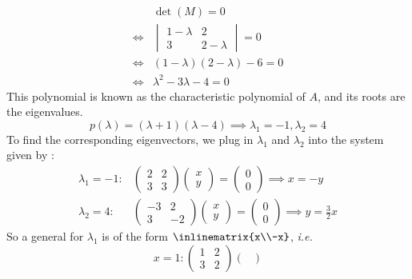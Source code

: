 \begin{exm}
\begin{align*}
		 & \det(M)=0                    \\
		\Leftrightarrow
		 & \begin{vmatrix}
			1-\lambda & 2         \\
			3         & 2-\lambda
		\end{vmatrix}=0 \\
		\Leftrightarrow
		 & (1-\lambda)(2-\lambda)-6=0   \\
		\Leftrightarrow
		 & \lambda^2-3\lambda-4=0
	\end{align*}
	This polynomial is known as the characteristic polynomial of $A$, and its roots
	are the eigenvalues.
	\begin{equation*}
		p(\lambda)=(\lambda+1)(\lambda-4) \implies \lambda_1=-1,\lambda_2=4
	\end{equation*}
	To find the corresponding eigenvectors, we plug in $\lambda_1$ and $\lambda_2$
	into the system given by :
	\begin{align*}
		\boxed{\lambda_1=-1}: & \begin{pmatrix}
			2 & 2 \\
			3 & 3
		\end{pmatrix}\begin{pmatrix}
			x \\ y
		\end{pmatrix}=\begin{pmatrix}
			0 \\ 0
		\end{pmatrix}\implies x=-y            \\
		\boxed{\lambda_2=4}:  & \begin{pmatrix}
			-3 & 2  \\
			3  & -2
		\end{pmatrix}\begin{pmatrix}
			x \\ y
		\end{pmatrix}=\begin{pmatrix}
			0 \\ 0
		\end{pmatrix}\implies y=\tfrac{3}{2}x
	\end{align*}
	So a general for $\lambda_1$ is of the form
	$\inlinematrix{x\\-x}$, \textit{i.e.}
	\begin{equation*}
		x=1:\begin{pmatrix}
			1 & 2 \\
			3 & 2
		\end{pmatrix}\begin{pmatrix}

\end{pmatrix}
\end{equation*}
\end{exm}
